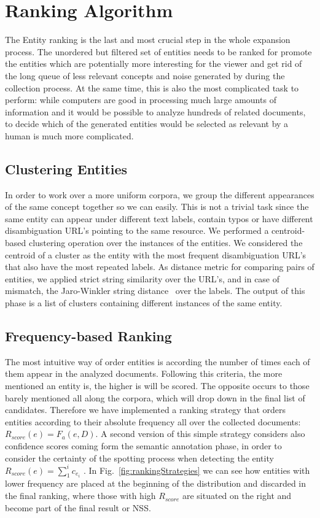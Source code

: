 \documentclass{llncs}
\begin{document}
\section{Ranking Algorithm}
\label{sec:Ranking}

The Entity ranking is the last and most crucial step in the whole expansion process. The unordered but filtered set of entities needs to be ranked for promote the entities which are potentially more interesting for the viewer and get rid of the long queue of less relevant concepts and noise generated by during the collection process. At the same time, this is also the most complicated task to perform: while computers are good in processing much large amounts of information and it would be possible to analyze hundreds of related documents, to decide which of the generated entities would be selected as relevant by a human is much more complicated. 

\subsection{Clustering Entities}
In order to work over a more uniform corpora, we group the different appearances of the same concept together so we can easily. This is not a trivial task since the same entity can appear under different text labels, contain typos or have different disambiguation URL's pointing to the same resource. We performed a centroid-based clustering operation over the instances of the entities. We considered the centroid of a cluster as the entity with the most frequent disambiguation URL's that also have the most repeated labels. As distance metric for comparing pairs of entities, we applied strict string similarity over the URL's, and in case of mismatch, the Jaro-Winkler string distance~\cite{winkler2006overview} over the labels. The output of this phase is a list of clusters containing different instances of the same entity.

\subsection{Frequency-based Ranking}

The most intuitive way of order entities is according the number of times each of them appear in the analyzed documents. Following this criteria, the more mentioned an entity is, the higher is will be scored. The opposite occurs to those barely mentioned all along the corpora, which will drop down in the final list of candidates. Therefore we have implemented a ranking strategy 
that orders entities according to their absolute frequency all over the collected documents: $R_{score}\left ( e \right ) =  F_{a}(e, D)$. 
A second version of this simple strategy considers also confidence scores coming form the semantic annotation phase, in order to consider the certainty of the spotting process when detecting the entity $R_{score}\left ( e \right ) =  \sum_{1}^{i}c_{e_{i}}$ . In Fig.~\ref{fig:rankingStrategies} we can see how entities with lower frequency are placed at the beginning of the distribution and discarded in the final ranking, where those with high $R_{score}$ are situated on the right and become part of the final result or NSS.
\end{document}
